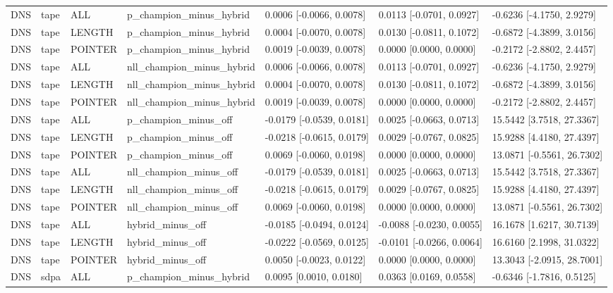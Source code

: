 \begin{tabular}{lllllll}
DNS & tape & ALL & p\_champion\_minus\_hybrid & 0.0006 [-0.0066, 0.0078] & 0.0113 [-0.0701, 0.0927] & -0.6236 [-4.1750, 2.9279] \\
DNS & tape & LENGTH & p\_champion\_minus\_hybrid & 0.0004 [-0.0070, 0.0078] & 0.0130 [-0.0811, 0.1072] & -0.6872 [-4.3899, 3.0156] \\
DNS & tape & POINTER & p\_champion\_minus\_hybrid & 0.0019 [-0.0039, 0.0078] & 0.0000 [0.0000, 0.0000] & -0.2172 [-2.8802, 2.4457] \\
DNS & tape & ALL & nll\_champion\_minus\_hybrid & 0.0006 [-0.0066, 0.0078] & 0.0113 [-0.0701, 0.0927] & -0.6236 [-4.1750, 2.9279] \\
DNS & tape & LENGTH & nll\_champion\_minus\_hybrid & 0.0004 [-0.0070, 0.0078] & 0.0130 [-0.0811, 0.1072] & -0.6872 [-4.3899, 3.0156] \\
DNS & tape & POINTER & nll\_champion\_minus\_hybrid & 0.0019 [-0.0039, 0.0078] & 0.0000 [0.0000, 0.0000] & -0.2172 [-2.8802, 2.4457] \\
DNS & tape & ALL & p\_champion\_minus\_off & -0.0179 [-0.0539, 0.0181] & 0.0025 [-0.0663, 0.0713] & 15.5442 [3.7518, 27.3367] \\
DNS & tape & LENGTH & p\_champion\_minus\_off & -0.0218 [-0.0615, 0.0179] & 0.0029 [-0.0767, 0.0825] & 15.9288 [4.4180, 27.4397] \\
DNS & tape & POINTER & p\_champion\_minus\_off & 0.0069 [-0.0060, 0.0198] & 0.0000 [0.0000, 0.0000] & 13.0871 [-0.5561, 26.7302] \\
DNS & tape & ALL & nll\_champion\_minus\_off & -0.0179 [-0.0539, 0.0181] & 0.0025 [-0.0663, 0.0713] & 15.5442 [3.7518, 27.3367] \\
DNS & tape & LENGTH & nll\_champion\_minus\_off & -0.0218 [-0.0615, 0.0179] & 0.0029 [-0.0767, 0.0825] & 15.9288 [4.4180, 27.4397] \\
DNS & tape & POINTER & nll\_champion\_minus\_off & 0.0069 [-0.0060, 0.0198] & 0.0000 [0.0000, 0.0000] & 13.0871 [-0.5561, 26.7302] \\
DNS & tape & ALL & hybrid\_minus\_off & -0.0185 [-0.0494, 0.0124] & -0.0088 [-0.0230, 0.0055] & 16.1678 [1.6217, 30.7139] \\
DNS & tape & LENGTH & hybrid\_minus\_off & -0.0222 [-0.0569, 0.0125] & -0.0101 [-0.0266, 0.0064] & 16.6160 [2.1998, 31.0322] \\
DNS & tape & POINTER & hybrid\_minus\_off & 0.0050 [-0.0023, 0.0122] & 0.0000 [0.0000, 0.0000] & 13.3043 [-2.0915, 28.7001] \\
DNS & sdpa & ALL & p\_champion\_minus\_hybrid & 0.0095 [0.0010, 0.0180] & 0.0363 [0.0169, 0.0558] & -0.6346 [-1.7816, 0.5125] \\

\end{tabular}
